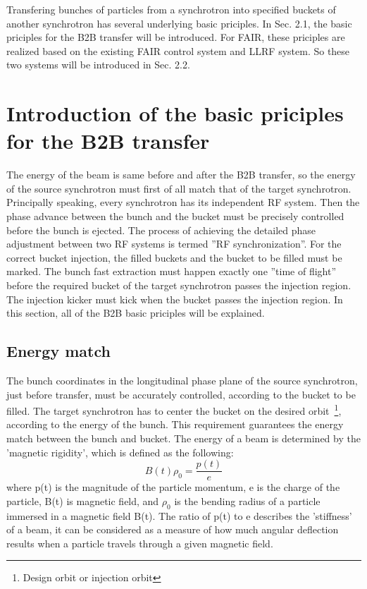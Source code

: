 Transfering bunches of particles from a synchrotron into specified buckets of another synchrotron has several underlying basic priciples. In Sec. 2.1, the basic priciples for the B2B transfer will be introduced. For FAIR, these priciples are realized based on the existing FAIR control system and LLRF system. So these two systems will be introduced in Sec. 2.2.  

\section {Introduction of the basic priciples for the B2B transfer}
The energy of the beam is same before and after the B2B transfer, so the energy of the source synchrotron must first of all match that of the target synchrotron. Principally speaking, every synchrotron has its independent RF system. Then the phase advance between the bunch and the bucket must be precisely controlled before the bunch is ejected. The process of achieving the detailed phase adjustment between two RF systems is termed ''RF synchronization''. For the correct bucket injection, the filled buckets and the bucket to be filled must be marked. The bunch fast extraction must happen exactly one ''time of flight'' before the required bucket of the target synchrotron passes the injection region. The injection kicker must kick when the bucket passes the injection region.  In this section, all of the B2B basic priciples will be explained.  
\subsection{Energy match}

The bunch coordinates in the longitudinal phase plane of the source synchrotron, just before transfer, must be accurately controlled, according to the bucket to be filled. The target synchrotron has to center the bucket on the desired orbit~\footnote {Design orbit or injection orbit}, according to the energy of the bunch. This requirement guarantees the energy match between the bunch and bucket. The energy of a beam is determined by the 'magnetic rigidity', which is defined as the following:
\begin{equation}
	\label{eq:energy}
	B(t)\rho_0 =\frac{p(t)}{e}
\end{equation}
where p(t) is the magnitude of the particle momentum, e is the charge of the particle, B(t) is magnetic field, and $\rho_0$ is the bending radius of a particle immersed in a magnetic field B(t). The ratio of p(t) to e describes the 'stiffness’ of a beam, it can be considered as a measure of how much angular deflection results when a particle travels through a given magnetic field.

